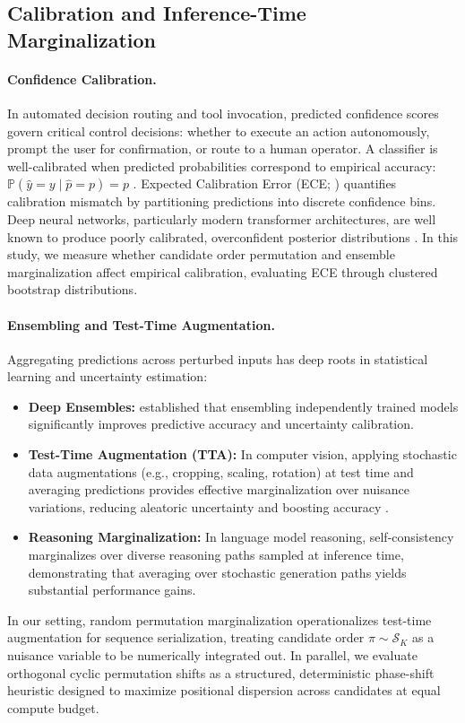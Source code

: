 \documentclass[11pt,a4paper]{article}
\begin{document}
\subsection{Calibration and Inference-Time Marginalization}
\paragraph{Confidence Calibration.} In automated decision routing and tool invocation, predicted confidence scores govern critical control decisions: whether to execute an action autonomously, prompt the user for confirmation, or route to a human operator. A classifier is well-calibrated when predicted probabilities correspond to empirical accuracy: $\mathbb{P}(\hat{y} = y \mid \hat{p} = p) = p$ \citep{guo2017calibration}. Expected Calibration Error (ECE; \citealp{naeini2015obtaining, nixon2019measuring}) quantifies calibration mismatch by partitioning predictions into discrete confidence bins. Deep neural networks, particularly modern transformer architectures, are well known to produce poorly calibrated, overconfident posterior distributions \citep{guo2017calibration}. In this study, we measure whether candidate order permutation and ensemble marginalization affect empirical calibration, evaluating ECE through clustered bootstrap distributions.

\paragraph{Ensembling and Test-Time Augmentation.} Aggregating predictions across perturbed inputs has deep roots in statistical learning and uncertainty estimation:
\begin{itemize}
    \item \textbf{Deep Ensembles:} \citet{lakshminarayanan2017simple} established that ensembling independently trained models significantly improves predictive accuracy and uncertainty calibration.
    \item \textbf{Test-Time Augmentation (TTA):} In computer vision, applying stochastic data augmentations (e.g., cropping, scaling, rotation) at test time and averaging predictions provides effective marginalization over nuisance variations, reducing aleatoric uncertainty and boosting accuracy \citep{ayhan2018test, shanmugam2020when}.
    \item \textbf{Reasoning Marginalization:} In language model reasoning, self-consistency \citep{wang2023selfconsistency} marginalizes over diverse reasoning paths sampled at inference time, demonstrating that averaging over stochastic generation paths yields substantial performance gains.
\end{itemize}
In our setting, random permutation marginalization operationalizes test-time augmentation for sequence serialization, treating candidate order $\pi \sim \mathcal{S}_K$ as a nuisance variable to be numerically integrated out. In parallel, we evaluate orthogonal cyclic permutation shifts as a structured, deterministic phase-shift heuristic designed to maximize positional dispersion across candidates at equal compute budget.
\end{document}
